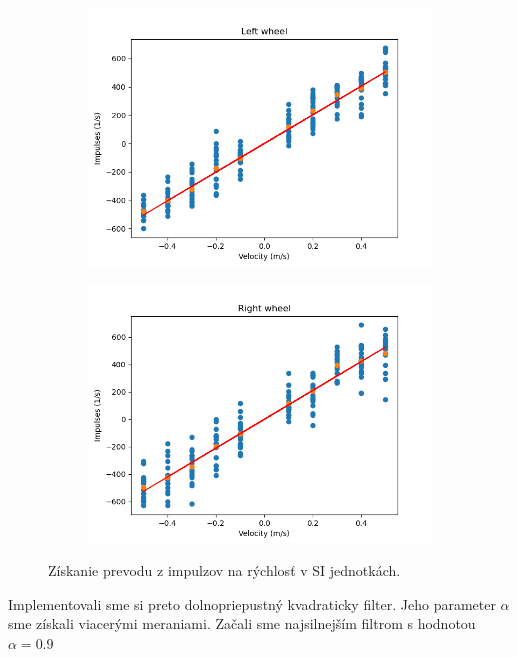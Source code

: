 \begin{figure}[!htbp]
	\begin{subfigure}{0.5\textwidth}
		\includegraphics[width=\textwidth]{img/lw_nf.png}
	\end{subfigure}
	\hfill
	\begin{subfigure}{0.5\textwidth}
		\includegraphics[width=\textwidth]{img/rw_nf.png}
	\end{subfigure}
	\caption{Získanie prevodu z impulzov na rýchlosť v SI jednotkách.}
	\label{fig:rw_lw_nf}
\end{figure}

Implementovali sme si preto dolnopriepustný kvadraticky filter. Jeho parameter \(\alpha\) sme získali viacerými meraniami. Začali sme
najsilnejším filtrom s hodnotou \(\alpha =  0.9\)

